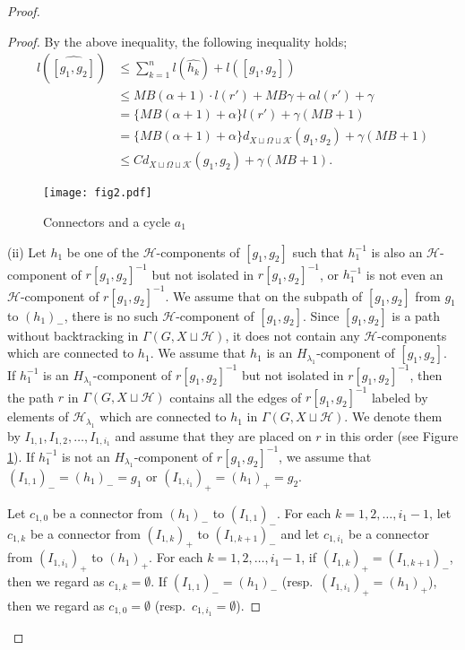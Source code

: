\documentclass{amsart}
\theoremstyle{definition}
\begin{document}
\begin{proof}
\begin{proof}
By the above inequality, the following inequality holds;
\begin{equation*}
\begin{split}
l(\widehat{[g_1,g_2]})&\leq \sum_{k=1}^n l(\widehat{h_k})+l([g_1,g_2])\\
&\leq  MB(\alpha+1)\cdot l(r')+MB\gamma+\alpha l(r')+\gamma\\
&= \{MB(\alpha+1)+\alpha \}l(r')+\gamma(MB+1)\\
&=\{MB(\alpha+1)+\alpha \}d_{X\sqcup \Omega\sqcup{\mathcal K}}(g_1,g_2)+\gamma(MB+1)\\
&\leq Cd_{X\sqcup\Omega\sqcup{\mathcal K}}(g_1,g_2)+\gamma(MB+1).
\end{split}
\end{equation*}

\begin{figure}[top]
\begin{center}
\texttt{[image: fig2.pdf]}
\end{center}
\caption{Connectors and a cycle $a_1$}
\label{fig2}
\end{figure}

(ii) Let $h_1$ be one of the ${\mathcal H}$-components of $[g_1,g_2]$ such that $h_1^{-1}$ is also an ${\mathcal H}$-component of $r[g_1,g_2]^{-1}$ but not isolated in $r[g_1,g_2]^{-1}$, or $h_1^{-1}$ is not even an ${\mathcal H}$-component of $r[g_1,g_2]^{-1}$. 
We assume that on the subpath of $[g_1,g_2]$ from $g_1$ to $(h_1)_-$, there is no such ${\mathcal H}$-component of $[g_1,g_2]$. 
Since $[g_1,g_2]$ is a path without backtracking in $\Gamma(G,X\sqcup{\mathcal H})$, it does not contain any ${\mathcal H}$-components which are connected to $h_1$. 
We assume that $h_1$ is an $H_{\lambda_1}$-component of $[g_1,g_2]$. 
If $h_1^{-1}$ is an $H_{\lambda_1}$-component of $r[g_1,g_2]^{-1}$ but not isolated in $r[g_1,g_2]^{-1}$, then the path $r$ in $\Gamma(G,X\sqcup{\mathcal H})$ contains all the edges of $r[g_1,g_2]^{-1}$ labeled by elements of ${\mathcal H}_{\lambda_1}$ which are connected to $h_1$ in $\Gamma(G,X\sqcup {\mathcal H})$. 
We denote them by $I_{1,1}, I_{1,2},\ldots, I_{1,i_1}$ and assume that they are placed on $r$ in this order (see Figure \ref{fig2}). 
If $h_1^{-1}$ is not an $H_{\lambda_1}$-component of $r[g_1,g_2]^{-1}$, we assume that $(I_{1,1})_-=(h_1)_-=g_1$ or $(I_{1,i_1})_+=(h_1)_+=g_2$. 

Let $c_{1,0}$ be a connector from $(h_1)_-$ to $(I_{1,1})_-$. 
For each $k=1,2,\ldots, i_1-1$, let $c_{1,k}$ be a connector from $(I_{1,k})_+$ to $(I_{1,k+1})_-$ and let $c_{1,i_1}$ be a connector from $(I_{1,i_1})_+$ to $(h_1)_+$. 
For each $k=1,2,\ldots, i_1-1$, if $(I_{1,k})_+=(I_{1,k+1})_-$, then we regard as $c_{1,k}=\emptyset$. 
If $(I_{1,1})_-=(h_1)_-$ (resp.\ $(I_{1,i_1})_+=(h_1)_+$), then we regard as $c_{1,0}=\emptyset$ (resp.\ $c_{1,i_1}=\emptyset$). 


\end{proof}
\end{proof}
\end{document}
